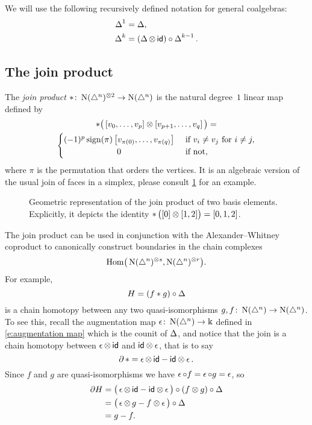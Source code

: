 We will use the following recursively defined notation for general coalgebras:
\begin{align*}
\operatorname{\Delta}^1 &= \operatorname{\Delta}, \\
\operatorname{\Delta}^k &= (\operatorname{\Delta} \otimes \, \mathsf{id}) \circ \operatorname{\Delta}^{k-1}.
\end{align*}

\subsection{The join product}

The \textit{join product} $\ast \colon \operatorname{N}(\triangle^n)^{\otimes 2} \to \operatorname{N}(\triangle^n)$ is the natural degree~$1$ linear map defined by
\begin{multline}
\ast \big(\left[v_0, \dots, v_p \right] \ot \left[v_{p+1}, \dots, v_q\right]\big) = \\
\begin{cases} (-1)^{p} \sign(\pi) \left[v_{\pi(0)}, \dots, v_{\pi(q)}\right] & \text{ if } v_i \neq v_j \text{ for } i \neq j, \\
\hfil 0 & \text{ if not}, \end{cases}
\end{multline}
where $\pi$ is the permutation that orders the vertices.
It is an algebraic version of the usual join of faces in a simplex, please consult \cref{f:join of faces} for an example.

\begin{figure}
	
	\caption{Geometric representation of the join product of two basis elements. Explicitly, it depicts the identity $\operatorname{\ast} \big( [0] \otimes [1,2] \big) = [0,1,2]$.}
	\label{f:join of faces}
\end{figure}

The join product can be used in conjunction with the Alexander--Whitney coproduct to canonically construct boundaries in the chain complexes
\[
\mathrm{Hom} \big( \operatorname{N}(\triangle^n)^{\otimes s}, \operatorname{N}(\triangle^n)^{\otimes r} \big).
\]
For example,
\[
H = (f \ast g) \circ \operatorname{\Delta}
\]
is a chain homotopy between any two quasi-isomorphisms $g, f \colon \operatorname{N}(\triangle^n) \to \operatorname{N}(\triangle^n)$.
To see this, recall the augmentation map $\operatorname{\epsilon} \colon \operatorname{N}(\triangle^n) \to \Bbbk$ defined in \eqref{e:augmentation map} which is the counit of $\operatorname{\Delta}$, and notice that the join is a chain homotopy between $\operatorname{\epsilon} \otimes \, \mathsf{id}$ and $\mathsf{id} \otimes \operatorname{\epsilon}$, that is to say
\begin{equation}
\partial \operatorname{\ast} = \operatorname{\epsilon} \otimes \, \mathsf{id} - \mathsf{id} \otimes \operatorname{\epsilon}.
\end{equation}
Since $f$ and $g$ are quasi-isomorphisms we have $\operatorname{\epsilon} \circ f = \operatorname{\epsilon} \circ g = \operatorname{\epsilon}$, so
\begin{align*}
\partial H &=
\big( \operatorname{\epsilon} \otimes \, \mathsf{id} - \mathsf{id} \otimes \operatorname{\epsilon} \big) \circ (f \otimes g) \circ \operatorname{\Delta} \\ &=
\big(\operatorname{\epsilon} \otimes \, g - f \otimes \operatorname{\epsilon} \big) \circ \operatorname{\Delta} \\ &= g - f.
\end{align*}

